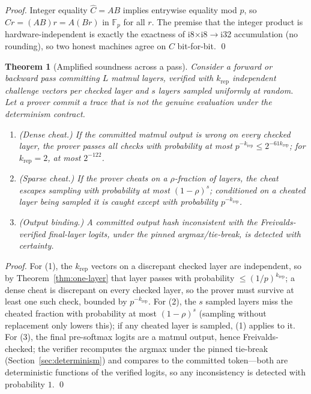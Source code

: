 \documentclass[11pt]{article}
\newtheorem{theorem}{Theorem}
\newcommand{\F}{\mathbb{F}}
\begin{document}
\begin{proof}
Integer equality $\hat C = AB$ implies entrywise equality mod $p$, so $\hat C r = (AB) r =
A(Br)$ in $\F_p$ for all $r$. The premise that the integer product is hardware-independent is
exactly the exactness of i8$\times$i8$\to$i32 accumulation (no rounding), so two honest
machines agree on $C$ bit-for-bit. \qed
\end{proof}

\begin{theorem}[Amplified soundness across a pass]
\label{thm:amplified}
Consider a forward or backward pass committing $L$ matmul layers, verified with
$k_{\mathrm{rep}}$ independent challenge vectors per checked layer and $s$ layers sampled
uniformly at random. Let a prover commit a trace that is not the genuine evaluation under the
determinism contract.
\begin{enumerate}[leftmargin=1.6em]
\item \textup{(Dense cheat.)} If the committed matmul output is wrong on every checked layer,
the prover passes all checks with probability at most $p^{-k_{\mathrm{rep}}} \le 2^{-61
k_{\mathrm{rep}}}$; for $k_{\mathrm{rep}} = 2$, at most $2^{-122}$.
\item \textup{(Sparse cheat.)} If the prover cheats on a $\rho$-fraction of layers, the cheat
escapes sampling with probability at most $(1-\rho)^s$; conditioned on a cheated layer being
sampled it is caught except with probability $p^{-k_{\mathrm{rep}}}$.
\item \textup{(Output binding.)} A committed output hash inconsistent with the
Freivalds-verified final-layer logits, under the pinned argmax/tie-break, is detected with
certainty.
\end{enumerate}
\end{theorem}

\begin{proof}
For (1), the $k_{\mathrm{rep}}$ vectors on a discrepant checked layer are independent, so by
Theorem~\ref{thm:one-layer} that layer passes with probability $\le (1/p)^{k_{\mathrm{rep}}}$;
a dense cheat is discrepant on every checked layer, so the prover must survive at least one
such check, bounded by $p^{-k_{\mathrm{rep}}}$. For (2), the $s$ sampled layers miss the
cheated fraction with probability at most $(1-\rho)^s$ (sampling without replacement only
lowers this); if any cheated layer is sampled, (1) applies to it. For (3), the final
pre-softmax logits are a matmul output, hence Freivalds-checked; the verifier recomputes the
argmax under the pinned tie-break (Section~\ref{sec:determinism}) and compares to the
committed token---both are deterministic functions of the verified logits, so any
inconsistency is detected with probability $1$. \qed
\end{proof}
\end{document}
